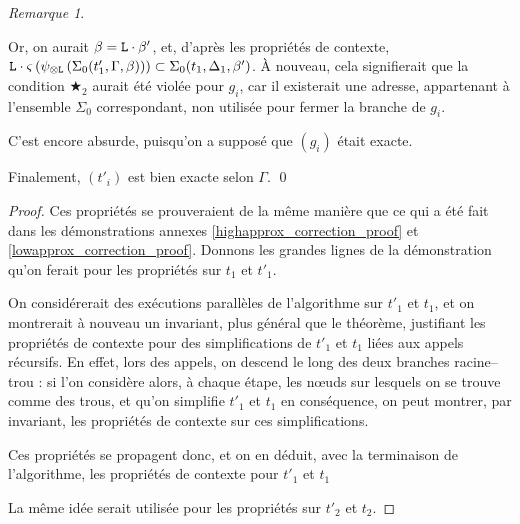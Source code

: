 \documentclass[11pt,a4paper]{article}
\theoremstyle{plain}
\theoremstyle{definition}
\theoremstyle{remark}
\newtheorem{remark}{Remarque}
\newcommand*{\tensor}{\otimes}
\newcommand*{\someperm}{\varsigma}
\newcommand*{\sequent}{\Gamma}
\newcommand*{\sequentbis}{\Delta}
\newcommand*{\Left}{\textnormal{\texttt{L}}}
\newcommand*{\lowapprox}{\ensuremath{\Sigma_0}}
\newcommand*{\exactcondbis}{\bigstar_2}
\begin{document}
\begin{remark}
\begin{itemize}
            Or, on aurait $\beta = \Left \cdot \beta'$, et, d'après les propriétés de contexte, $\Left \cdot \someperm \left( \psi_{\tensor\Left} \left(\lowapprox(t'_1, \sequent, \beta)\right) \right) \subset \lowapprox(t_1, \sequentbis_1, \beta')$. À nouveau, cela signifierait que la condition $\exactcondbis$ aurait été violée pour $g_i$, car il existerait une adresse, appartenant à l'ensemble $\lowapprox$ correspondant, non utilisée pour fermer la branche de $g_i$. 
            
            C'est encore absurde, puisqu'on a supposé que $(g_i)$ était exacte.
    \end{itemize}

    Finalement, $(t'_i)$ est bien exacte selon $\sequent$. \qed
\end{remark}

\begin{proof}
    Ces propriétés se prouveraient de la même manière que ce qui a été fait dans les démonstrations annexes \ref{highapprox_correction_proof} et \ref{lowapprox_correction_proof}. Donnons les grandes lignes de la démonstration qu'on ferait pour les propriétés sur $t_1$ et $t'_1$. 
    
    On considérerait des exécutions parallèles de l'algorithme sur $t'_1$ et $t_1$, et on montrerait à nouveau un invariant, plus général que le théorème, justifiant les propriétés de contexte pour des simplifications de $t'_1$ et $t_1$ liées aux appels récursifs. En effet, lors des appels, on descend le long des deux branches racine--trou : si l'on considère alors, à chaque étape, les n\oe uds sur lesquels on se trouve comme des trous, et qu'on simplifie $t'_1$ et $t_1$ en conséquence, on peut montrer, par invariant, les propriétés de contexte sur ces simplifications.

    Ces propriétés se propagent donc, et on en déduit, avec la terminaison de l'algorithme, les propriétés de contexte pour $t'_1$ et $t_1$
    
    La même idée serait utilisée pour les propriétés sur $t'_2$ et $t_2$.
\end{proof}
\end{document}
